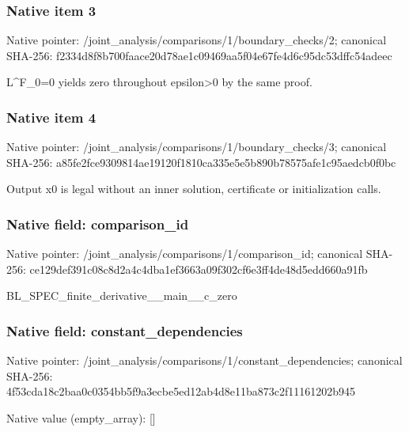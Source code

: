 \documentclass[10pt,a4paper]{article}
\begin{document}
\subsubsection{Native item 3}
Native pointer: /joint\_\allowbreak{}analysis/comparisons/1/boundary\_\allowbreak{}checks/2; canonical SHA-256: f2334d8f8b700faace20d78ae1c09469aa5f04e67fe4d6c95dc53dffc54adeec

\begingroup\raggedright\sloppy L\textasciicircum{}F\_\allowbreak{}0=\allowbreak{}0 yields zero throughout epsilon>0 by the same proof.\par\endgroup

\subsubsection{Native item 4}
Native pointer: /joint\_\allowbreak{}analysis/comparisons/1/boundary\_\allowbreak{}checks/3; canonical SHA-256: a85fe2fce9309814ae19120f1810ca335e5e5b890b78575afe1c95aedcb0f0bc

\begingroup\raggedright\sloppy Output x0 is legal without an inner solution,\allowbreak{} certificate or initialization calls.\par\endgroup

\subsubsection{Native field: comparison\_\allowbreak{}id}
Native pointer: /joint\_\allowbreak{}analysis/comparisons/1/comparison\_\allowbreak{}id; canonical SHA-256: ce129def391c08c8d2a4c4dba1ef3663a09f302cf6e3ff4de48d5edd660a91fb

\begingroup\raggedright\sloppy BL\_\allowbreak{}SPEC\_\allowbreak{}finite\_\allowbreak{}derivative\_\allowbreak{}\_\allowbreak{}main\_\allowbreak{}\_\allowbreak{}c\_\allowbreak{}zero\par\endgroup

\subsubsection{Native field: constant\_\allowbreak{}dependencies}
Native pointer: /joint\_\allowbreak{}analysis/comparisons/1/constant\_\allowbreak{}dependencies; canonical SHA-256: 4f53cda18c2baa0c0354bb5f9a3ecbe5ed12ab4d8e11ba873c2f11161202b945

Native value (empty\_\allowbreak{}array): []
\end{document}
